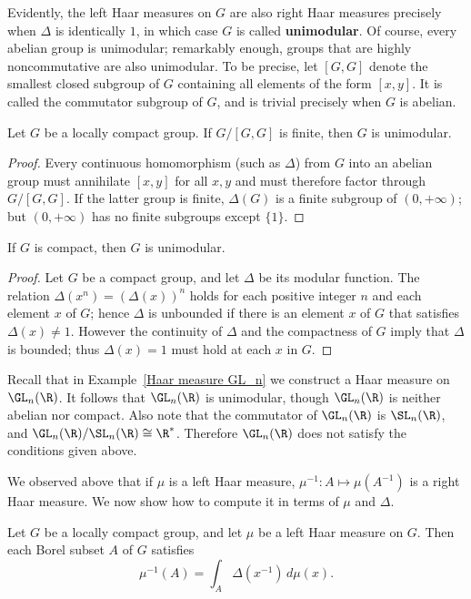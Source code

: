 Evidently, the left Haar measures on $G$ are also right Haar measures precisely when $\Delta$ is identically $1$, in which case $G$ is called \textbf{unimodular}. Of course, every abelian group is unimodular; remarkably enough, groups that are highly noncommutative are also unimodular. To be precise, let $[G,G]$ denote the smallest closed subgroup of $G$ containing all elements of the form $[x,y]$. It is called the commutator subgroup of $G$, and is trivial precisely when $G$ is abelian.
\begin{proposition}
Let $G$ be a locally compact group. If $G/[G,G]$ is finite, then $G$ is unimodular.
\end{proposition}
\begin{proof}
Every continuous homomorphism (such as $\Delta$) from $G$ into an abelian group must annihilate $[x,y]$ for all $x,y$ and must therefore factor through $G/[G,G]$. If the latter group is finite, $\Delta(G)$ is a finite subgroup of $(0,+\infty)$; but $(0,+\infty)$ has no finite subgroups except $\{1\}$.
\end{proof}
\begin{proposition}
If $G$ is compact, then $G$ is unimodular.
\end{proposition}
\begin{proof}
Let $G$ be a compact group, and let $\Delta$ be its modular function. The relation $\Delta(x^n)=(\Delta(x))^n$ holds for each positive integer $n$ and each element $x$ of $G$; hence $\Delta$ is unbounded if there is an element $x$ of $G$ that satisfies $\Delta(x)\neq 1$. However the continuity of $\Delta$ and the compactness of $G$ imply that $\Delta$ is bounded; thus $\Delta(x)=1$ must hold at each $x$ in $G$.
\end{proof}
\begin{example}
Recall that in Example~\ref{Haar measure GL_n} we construct a Haar measure on $\GL_n(\R)$. It follows that $\GL_n(\R)$ is unimodular, though $\GL_n(\R)$ is neither abelian nor compact. Also note that the commutator of $\GL_n(\R)$ is $\SL_n(\R)$, and $\GL_n(\R)/\SL_n(\R)\cong\R^*$. Therefore $\GL_n(\R)$ does not satisfy the conditions given above.
\end{example}
We observed above that if $\mu$ is a left Haar measure, $\mu^{-1}:A\mapsto\mu(A^{-1})$ is a right Haar measure. We now show how to compute it in terms of $\mu$ and $\Delta$.
\begin{proposition}\label{Haar measure inversion}
Let $G$ be a locally compact group, and let $\mu$ be a left Haar measure on $G$. Then each Borel subset $A$ of $G$ satisfies
\[\mu^{-1}(A)=\int_A\Delta(x^{-1})\,d\mu(x).\]
\end{proposition}
